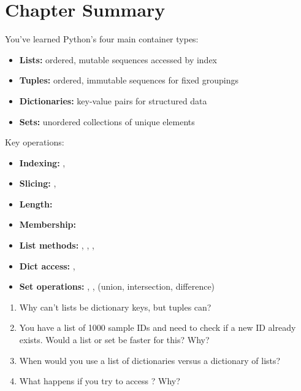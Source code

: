 \section{Chapter Summary}
\label{sec:containers-summary}

You've learned Python's four main container types:

\begin{itemize}
    \item \textbf{Lists:} ordered, mutable sequences accessed by index
    \item \textbf{Tuples:} ordered, immutable sequences for fixed groupings
    \item \textbf{Dictionaries:} key-value pairs for structured data
    \item \textbf{Sets:} unordered collections of unique elements
\end{itemize}

Key operations:

\begin{itemize}
    \item \textbf{Indexing:} , 
    \item \textbf{Slicing:} , 
    \item \textbf{Length:} 
    \item \textbf{Membership:} 
    \item \textbf{List methods:} , , , 
    \item \textbf{Dict access:} , 
    \item \textbf{Set operations:} \py{|}, \py{\&}, \py{-} (union, intersection, difference)
\end{itemize}

\begin{ponder}
\begin{enumerate}
    \item Why can't lists be dictionary keys, but tuples can?
    \item You have a list of 1000 sample IDs and need to check if a new ID already exists. Would a list or set be faster for this? Why?
    \item When would you use a list of dictionaries versus a dictionary of lists?
    \item What happens if you try to access ? Why?
\end{enumerate}
\end{ponder}

